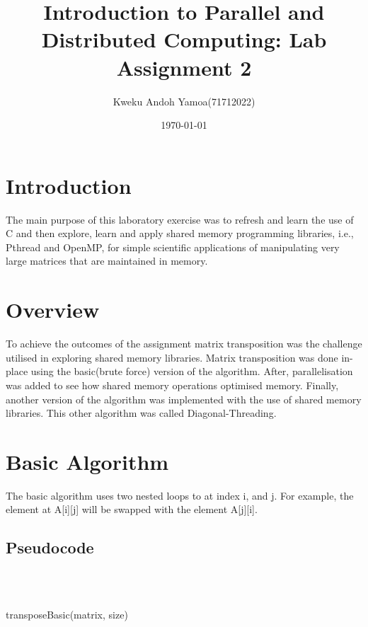 \documentclass[12pt, a4paper, fleqn, titlepage]{article}
\title{Introduction to Parallel and Distributed Computing: Lab Assignment 2}
\author{Kweku Andoh Yamoa(71712022)}
\date{\today}
\begin{document}
\maketitle
\justify

\section{Introduction}
    The main purpose of this laboratory exercise was to refresh and learn the use of C and then explore,
    learn and apply shared memory programming libraries, i.e., Pthread and OpenMP, for simple
    scientific applications of manipulating very large matrices that are maintained in memory.

\section{Overview}
    To achieve the outcomes of the assignment matrix transposition was the challenge utilised in exploring shared memory libraries. Matrix transposition was done in-place using the basic(brute force) version of the algorithm. After, parallelisation was added to see how shared memory operations optimised memory. Finally, another version of the algorithm was implemented with the use of shared memory libraries. This other algorithm was called Diagonal-Threading.

\section{Basic Algorithm}
    The basic algorithm uses two nested loops to  at index i, and j. For example, the element at A[i][j] will be swapped with the element A[j][i].

    \subsection{Pseudocode}
        \begin{algorithm}[H]
            \\
            \\
            \linebreak


            \begin{flushleft}
                \caption{transposeBasic(matrix, size)}
            \end{flushleft}
        \end{algorithm}    
\end{document}
